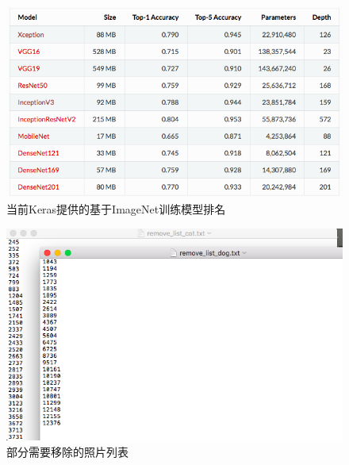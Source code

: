 \documentclass[a4paper,11pt]{article}
\begin{document}
\begin{figure}[htb]
\centering
\includegraphics[scale=0.4]{./figure/keras.png}
\caption{当前Keras提供的基于ImageNet训练模型排名}
\label{fig:keras}
\end{figure}

\begin{figure}[htb]
\centering
\includegraphics[scale=0.4]{./figure/removelist.png}
\caption{部分需要移除的照片列表}
\label{fig:remove}
\end{figure}
\end{document}
